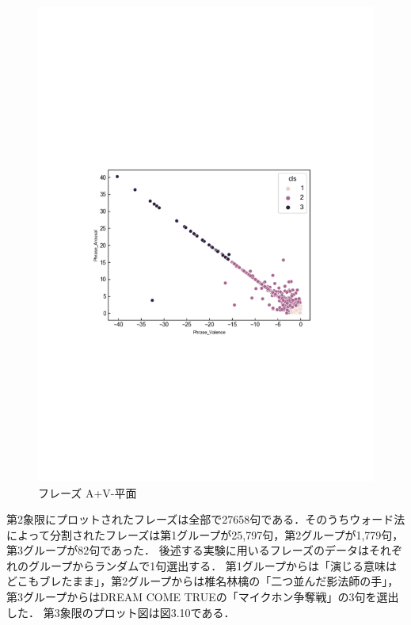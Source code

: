 \begin{figure}[H]
    \centering
    \includegraphics[width=14cm]{phrase_A+V-.pdf}
    \vspace{-1mm}
    \caption{フレーズ A+V-平面}
    \label{fig:mms}
    \vspace{5mm}
\end{figure}
第2象限にプロットされたフレーズは全部で27658句である．そのうちウォード法によって分割されたフレーズは第1グループが25,797句，第2グループが1,779句，第3グループが82句であった．
後述する実験に用いるフレーズのデータはそれぞれのグループからランダムで1句選出する．
第1グループからは「演じる意味はどこもブレたまま」，第2グループからは椎名林檎の「二つ並んだ影法師の手」，第3グループからはDREAM COME TRUEの「マイクホン争奪戦」の3句を選出した．
\newpage
第3象限のプロット図は図3.10である．
